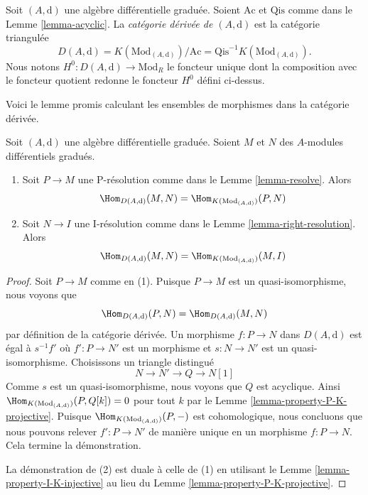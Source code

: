 \begin{definition}
\label{definition-unbounded-derived-category}
Soit $(A, \text{d})$ une algèbre différentielle graduée. Soient $\text{Ac}$ et
$\text{Qis}$ comme dans le Lemme \ref{lemma-acyclic}. La {\it catégorie dérivée de
$(A, \text{d})$} est la catégorie triangulée
$$
D(A, \text{d}) =
K(\text{Mod}_{(A, \text{d})})/\text{Ac} =
\text{Qis}^{-1}K(\text{Mod}_{(A, \text{d})}).
$$
Nous notons $H^0 : D(A, \text{d}) \to \text{Mod}_R$ le foncteur unique dont la
composition avec le foncteur quotient redonne le foncteur $H^0$ défini ci-dessus.
\end{definition}

\noindent
Voici le lemme promis calculant les ensembles de morphismes dans la catégorie
dérivée.

\begin{lemma}
\label{lemma-hom-derived}
Soit $(A, \text{d})$ une algèbre différentielle graduée. Soient $M$ et $N$ des
$A$-modules différentiels gradués.
\begin{enumerate}
\item Soit $P \to M$ une P-résolution comme dans le Lemme \ref{lemma-resolve}.
Alors
$$
\Hom_{D(A, \text{d})}(M, N) =
\Hom_{K(\text{Mod}_{(A, \text{d})})}(P, N)
$$
\item Soit $N \to I$ une I-résolution comme dans le Lemme
\ref{lemma-right-resolution}. Alors
$$
\Hom_{D(A, \text{d})}(M, N) =
\Hom_{K(\text{Mod}_{(A, \text{d})})}(M, I)
$$
\end{enumerate}
\end{lemma}

\begin{proof}
Soit $P \to M$ comme en (1). Puisque $P \to M$ est un quasi-isomorphisme, nous
voyons que
$$
\Hom_{D(A, \text{d})}(P, N) = \Hom_{D(A, \text{d})}(M, N)
$$
par définition de la catégorie dérivée. Un morphisme $f : P \to N$ dans $D(A,
\text{d})$ est égal à $s^{-1}f'$ où $f' : P \to N'$ est un morphisme et $s : N \to
N'$ est un quasi-isomorphisme. Choisissons un triangle distingué
$$
N \to N' \to Q \to N[1]
$$
Comme $s$ est un quasi-isomorphisme, nous voyons que $Q$ est acyclique. Ainsi
$\Hom_{K(\text{Mod}_{(A, \text{d})})}(P, Q[k]) = 0$ pour tout $k$ par le Lemme
\ref{lemma-property-P-K-projective}. Puisque $\Hom_{K(\text{Mod}_{(A,
\text{d})})}(P, -)$ est cohomologique, nous concluons que nous pouvons relever $f'
: P \to N'$ de manière unique en un morphisme $f : P \to N$. Cela termine la
démonstration.

\medskip\noindent
La démonstration de (2) est duale à celle de (1) en utilisant le Lemme
\ref{lemma-property-I-K-injective} au lieu du Lemme
\ref{lemma-property-P-K-projective}.
\end{proof}

